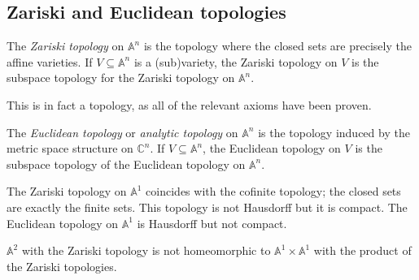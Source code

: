 \subsection{Zariski and Euclidean topologies}
\begin{definition}
    The \emph{Zariski topology} on \( \mathbb A^n \) is the topology where the closed sets are precisely the affine varieties.
    If \( V \subseteq \mathbb A^n \) is a (sub)variety, the Zariski topology on \( V \) is the subspace topology for the Zariski topology on \( \mathbb A^n \).
\end{definition}
\begin{remark}
    This is in fact a topology, as all of the relevant axioms have been proven.
\end{remark}
\begin{definition}
    The \emph{Euclidean topology} or \emph{analytic topology} on \( \mathbb A^n \) is the topology induced by the metric space structure on \( \mathbb C^n \).
    If \( V \subseteq \mathbb A^n \), the Euclidean topology on \( V \) is the subspace topology of the Euclidean topology on \( \mathbb A^n \).
\end{definition}
\begin{proposition}
    The Zariski topology on \( \mathbb A^1 \) coincides with the cofinite topology; the closed sets are exactly the finite sets.
    This topology is not Hausdorff but it is compact.
    The Euclidean topology on \( \mathbb A^1 \) is Hausdorff but not compact.
\end{proposition}
\begin{remark}
    \( \mathbb A^2 \) with the Zariski topology is not homeomorphic to \( \mathbb A^1 \times \mathbb A^1 \) with the product of the Zariski topologies.
\end{remark}

